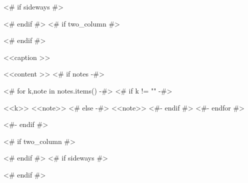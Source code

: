 \begin{<< env  >>}
  \centering
  <# if sideways #>
  \begin{adjustbox}{angle=90}
  <# endif #>
  <# if two_column #>
  \begin{adjustbox}{width=\textwidth}
  <# endif #>
  \begin{threeparttable}
    \caption{<<caption >>}
    <<content >>
    <# if notes -#>
    \begin{tablenotes}
      <# for k,note in notes.items() -#>
      <# if k != "" -#>
      \item [<<k>>] <<note>>
      <# else -#>
      <<note>>
      <#- endif #>
      <#- endfor #>
    \end{tablenotes}
    <#- endif #>
  \end{threeparttable}
  <# if two_column #>
  \end{adjustbox}
  <# endif #>
  <# if sideways #>
  \end{adjustbox}
  <# endif #>
  \label{tbl:<< id >>}
\end{<< env  >>}
